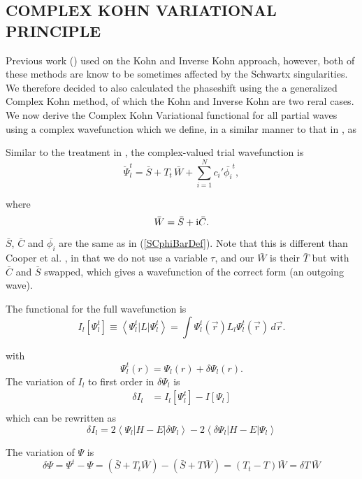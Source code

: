 \documentclass[preprint,showpacs,preprintnumbers,amsmath,amssymb]{revtex4}
\newcommand{\beq}{\begin{equation}}
\newcommand{\eeq}{\end{equation}}
\newcommand{\ii}{{\rm{i}}}
\begin{document}
\subsection{COMPLEX KOHN VARIATIONAL PRINCIPLE}









Previous work () used on the Kohn and Inverse Kohn approach, however, both of these methods are know to be sometimes affected by the Schwartx singularities. We therefore decided to also calculated the phaseshift using the a generalized  Complex Kohn method, of which the Kohn and Inverse Kohn are two reral cases.
We now derive the Complex Kohn Variational functional for all partial waves using a complex wavefunction which we define, in a similar manner to that in  \cite{Cooper2010}, as 


Similar to the treatment in \cite{Cooper2010}, the complex-valued trial wavefunction is
\beq
\breve{\Psi}_l^t = \bar{S} + T_t \, \bar{W} + \sum_{i=1}^N c_i' \bar{\phi_i}^t,
\label{eq:TrialComplex}
\eeq

where
\beq
\bar{W} = \bar{S} + \ii \bar{C}.
\label{eq:WDef}
\eeq

$\bar{S}$, $\bar{C}$ and $\bar{\phi_i}$ are the same as in (\ref{SCphiBarDef}).  Note that this is different than Cooper et al. \cite{Cooper2010}, in that we do not use a variable $\tau$, and our $\bar{W}$ is their $\bar{T}$ but with $\bar{C}$ and $\bar{S}$ swapped, which gives a wavefunction of the correct form (an outgoing wave).

The functional  for the full wavefunction is
\beq
I_l[\Psi_l^t] \equiv \left<\Psi_l^t | L | \Psi_l^t \right> = \int \Psi_l^t(\vec{r}) L_l \Psi_l^t(\vec{r}) \,d\vec{r}.
\label{eq:IlDefPsi}
\eeq

\noindent with
\beq
\Psi_l^t(r) = \Psi_l(r) + \delta \Psi_l(r).
\label{eq:PsilTrialRelation}
\eeq
\noindent The variation of $I_l$ to first order in $\delta\Psi_l$ is
\begin{align}
\nonumber \delta I_l &= I_l[\Psi_l^t] - I[\Psi_l] \\
\label{eq:IlPsiVariation1}
\end{align}
which can be rewritten as 
\beq
\delta I_l = 2 \left<\Psi_l | H\!-\!E | \delta\Psi_l\right> - 2 \left<\delta\Psi_l | H\!-\!E | \Psi_l\right>
\label{eq:IlPsiVariation2}
\eeq



The variation of $\Psi$ is
\beq
\delta\Psi = \Psi^t - \Psi = (\bar{S} + T_t \bar{W}) - (\bar{S} + T \bar{W}) = (T_t - T) \bar{W} = \delta T \,\bar{W}
\eeq
\end{document}
